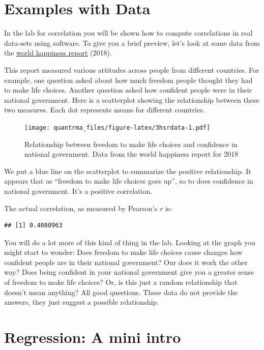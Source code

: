 \documentclass[
]{book}
\begin{document}
\hypertarget{examples-with-data}{%
\section{Examples with Data}\label{examples-with-data}}

In the lab for correlation you will be shown how to compute correlations in real data-sets using software. To give you a brief preview, let's look at some data from the \href{http://worldhappiness.report}{world happiness report} (2018).

This report measured various attitudes across people from different countries. For example, one question asked about how much freedom people thought they had to make life choices. Another question asked how confident people were in their national government. Here is a scatterplot showing the relationship between these two measures. Each dot represents means for different countries.

\begin{figure}
\centering
\texttt{[image: quantrma\_files/figure-latex/3hsrdata-1.pdf]}
\caption{\label{fig:3hsrdata}Relationship between freedom to make life choices and confidence in national government. Data from the world happiness report for 2018}
\end{figure}

We put a blue line on the scatterplot to summarize the positive relationship. It appears that as ``freedom to make life choices goes up'', so to does confidence in national government. It's a positive correlation.

The actual correlation, as measured by Pearson's \(r\) is:

\begin{verbatim}
## [1] 0.4080963
\end{verbatim}

You will do a lot more of this kind of thing in the lab. Looking at the graph you might start to wonder: Does freedom to make life choices cause changes how confident people are in their national government? Our does it work the other way? Does being confident in your national government give you a greater sense of freedom to make life choices? Or, is this just a random relationship that doesn't mean anything? All good questions. These data do not provide the answers, they just suggest a possible relationship.

\hypertarget{regression-a-mini-intro}{%
\section{Regression: A mini intro}\label{regression-a-mini-intro}}
\end{document}
